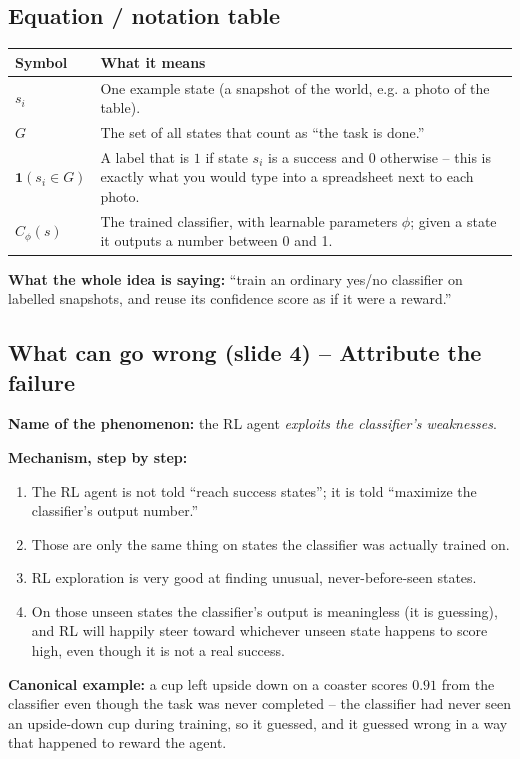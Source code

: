 \documentclass[11pt]{article}
\begin{document}
\subsection*{Equation / notation table}
\begin{center}
\begin{tabular}{|>{\raggedright\arraybackslash}p{3.2cm}|>{\raggedright\arraybackslash}p{10.3cm}|}
\hline
\textbf{Symbol} & \textbf{What it means} \\
\hline
$s_i$ & One example state (a snapshot of the world, e.g. a photo of the table). \\
\hline
$G$ & The set of all states that count as ``the task is done.'' \\
\hline
$\mathbf{1}(s_i \in G)$ & A label that is $1$ if state $s_i$ is a success and $0$
otherwise -- this is exactly what you would type into a spreadsheet next to each
photo. \\
\hline
$C_\phi(s)$ & The trained classifier, with learnable parameters $\phi$; given a
state it outputs a number between 0 and 1. \\
\hline
\end{tabular}
\end{center}
\textbf{What the whole idea is saying:} ``train an ordinary yes/no classifier on
labelled snapshots, and reuse its confidence score as if it were a reward.''

\subsection{What can go wrong (slide 4) -- Attribute the failure}
\textbf{Name of the phenomenon:} the RL agent \emph{exploits the classifier's
weaknesses}.

\textbf{Mechanism, step by step:}
\begin{enumerate}
  \item The RL agent is not told ``reach success states''; it is told ``maximize
  the classifier's output number.''
  \item Those are only the same thing on states the classifier was actually
  trained on.
  \item RL exploration is very good at finding unusual, never-before-seen states.
  \item On those unseen states the classifier's output is meaningless (it is
  guessing), and RL will happily steer toward whichever unseen state happens to
  score high, even though it is not a real success.
\end{enumerate}
\textbf{Canonical example:} a cup left upside down on
a coaster scores $0.91$ from the classifier even though the task was never
completed -- the classifier had never seen an upside-down cup during training, so
it guessed, and it guessed wrong in a way that happened to reward the agent.
\end{document}

